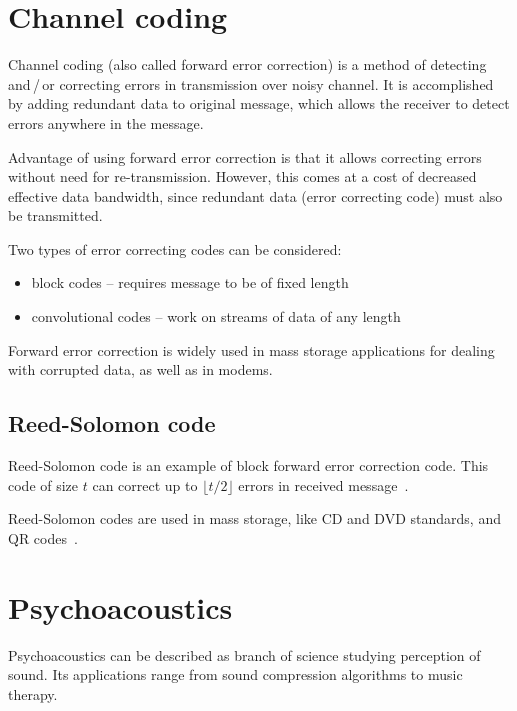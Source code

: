 \clearpage

\section{Channel coding}

Channel coding (also called forward error correction) is a method of detecting and\,/\,or correcting errors in transmission over noisy channel.
It is accomplished by adding redundant data to original message, which allows the receiver to detect errors anywhere in the message.

Advantage of using forward error correction is that it allows correcting errors without need for re-transmission.
However, this comes at a cost of decreased effective data bandwidth, since redundant data (error correcting code) must also be transmitted.

Two types of error correcting codes can be considered:

\begin{itemize}
\item block codes -- requires message to be of fixed length
\item convolutional codes -- work on streams of data of any length
\end{itemize}

Forward error correction is widely used in mass storage applications for dealing with corrupted data, as well as in modems.

\subsection{Reed-Solomon code}
\label{subsec:reedsolomon}

Reed-Solomon code is an example of block forward error correction code. This code of size $t$ can correct up to $\lfloor t/2\rfloor$ errors in received message~\cite{ReedSolo}.


Reed-Solomon codes are used in mass storage, like CD and DVD standards, and QR codes~\cite{ReedSoloApplications}.

\section{Psychoacoustics}

Psychoacoustics can be described as branch of science studying perception of sound. Its applications range from sound compression algorithms to music therapy.

